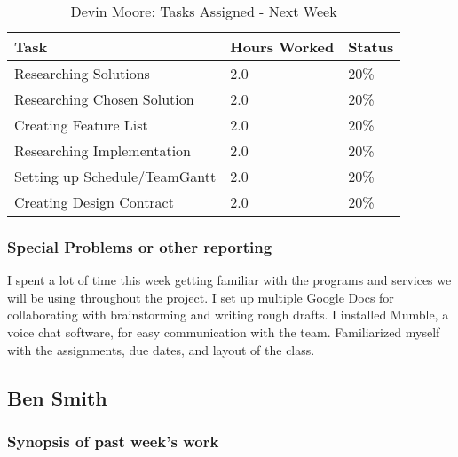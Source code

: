 \documentclass[12pt,article,compsoc]{IEEEtran}
\begin{document}
	\begin{table}[ht]
	\renewcommand{\arraystretch}{1.3}
		\caption{Devin Moore: Tasks Assigned - Next Week}
		
		\label{Summary of Devin Moore's activites: this week}
		
		\centering
		\begin{tabular}{p{5.5cm}|p{1cm}|p{1cm}}

		\hline
		\bfseries 	Task		 		& \bfseries Hours Worked	& \bfseries Status	\\
		\hline\hline
					Researching Solutions			& 2.0						& 20\%				\\	%
					Researching Chosen Solution		& 2.0						& 20\%			\\
					Creating Feature List		 	& 2.0						& 20\%			\\
					Researching Implementation		& 2.0						& 20\%			\\
					Setting up Schedule/TeamGantt	& 2.0						& 20\%			\\
					Creating Design Contract		& 2.0						& 20\%			\\	
		\hline
		\end{tabular}
	\end{table}

	\subsubsection*{Special Problems or other reporting}
	I spent a lot of time this week getting familiar with the programs and services we will be using throughout the project. I set up multiple Google Docs for collaborating with brainstorming and writing rough drafts. I installed Mumble, a voice chat software, for easy communication with the team. Familiarized myself with the assignments, due dates, and layout of the class. 
	\clearpage

\subsection{Ben Smith}

	\subsubsection*{Synopsis of past week's work}
\end{document}
